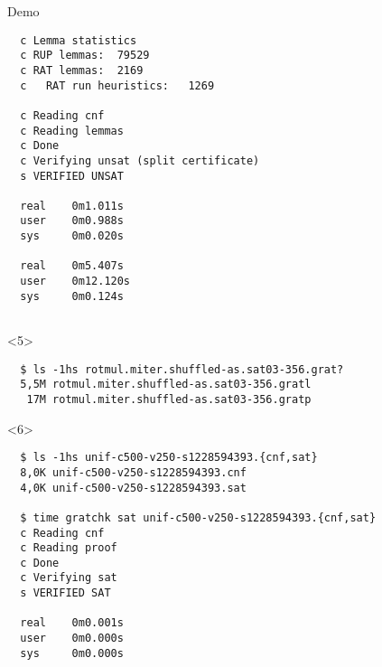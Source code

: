 \documentclass[fleqn]{beamer}
\begin{document}
\begin{frame}[t,fragile]{Demo}
\begin{onlyenv}
\begin{verbatim}
  c Lemma statistics
  c RUP lemmas:  79529
  c RAT lemmas:  2169
  c   RAT run heuristics:   1269

  c Reading cnf
  c Reading lemmas
  c Done
  c Verifying unsat (split certificate)
  s VERIFIED UNSAT

  real    0m1.011s
  user    0m0.988s
  sys     0m0.020s

  real    0m5.407s
  user    0m12.120s
  sys     0m0.124s
  
  \end{verbatim}  
  \end{onlyenv}

  \begin{onlyenv}<5>
  \begin{verbatim}  
  $ ls -1hs rotmul.miter.shuffled-as.sat03-356.grat?
  5,5M rotmul.miter.shuffled-as.sat03-356.gratl
   17M rotmul.miter.shuffled-as.sat03-356.gratp
  \end{verbatim}  
  \end{onlyenv}

  
  \begin{onlyenv}<6>
  \begin{verbatim}  
  $ ls -1hs unif-c500-v250-s1228594393.{cnf,sat}
  8,0K unif-c500-v250-s1228594393.cnf
  4,0K unif-c500-v250-s1228594393.sat
  
  $ time gratchk sat unif-c500-v250-s1228594393.{cnf,sat}
  c Reading cnf
  c Reading proof
  c Done
  c Verifying sat
  s VERIFIED SAT

  real    0m0.001s
  user    0m0.000s
  sys     0m0.000s
  \end{verbatim}  
  \end{onlyenv}
  
  
\end{frame}
\end{document}
